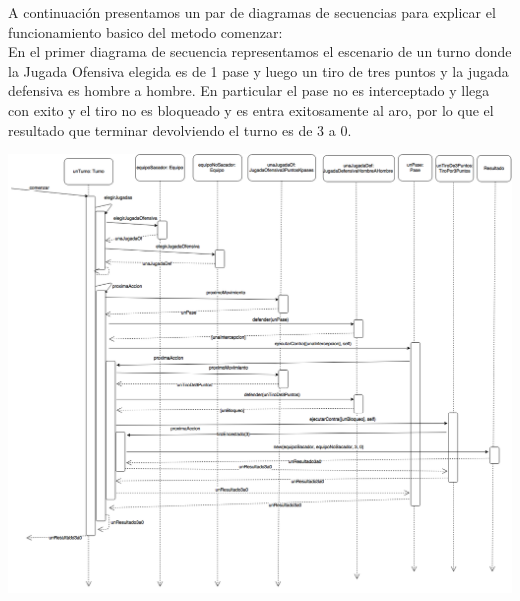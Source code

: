 A continuación presentamos un par de diagramas de secuencias para explicar el funcionamiento basico del metodo comenzar: \\

En el primer diagrama de secuencia representamos el escenario de un turno donde la Jugada Ofensiva elegida es de 1 pase y luego un tiro de tres puntos y la jugada defensiva es hombre a hombre. En particular el pase no es interceptado y llega con exito y el tiro no es bloqueado y es entra exitosamente al aro, por lo que el resultado que terminar devolviendo el turno es de 3 a 0.
\begin{center}
  \includegraphics[scale=0.35]{imagenes/turno-pase-y-tiro-exitosos.png}
\end{center}

